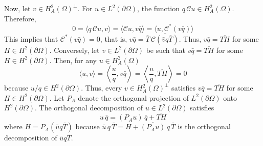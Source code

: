 \documentclass[11pt, reqno]{amsart}
\numberwithin{equation}{section}
\newcommand{\ov}{\overline}
\newcommand{\Om}{\Omega}
\begin{document}
\medskip

Now, let $v\in H_A^2(\Om)^{\perp}$. For $u\in L^2(\partial\Om)$, the function $q\,\mathcal{C}u \in H_A^2(\Omega)$. Therefore,
\[
0=\langle q\,\mathcal{C}u, v\rangle
= \langle \mathcal{C}u, v\bar{q}\rangle
= \langle u, \mathcal{C}^* (v\bar{q})\rangle
\]
This implies that $ \mathcal{C}^* (v\bar{q}) = 0$, that is, $v\bar{q} = \ov{T}\, \overline{\mathcal{C}(\bar{v}q\ov{T})}$. Thus, $v \bar{q} = \overline{TH}$ for some $H\in H^2(\partial\Om)$. Conversely, let $v\in L^2(\partial\Om)$ be such that $v \bar{q} = \overline{TH}$ for some $H\in H^2(\partial\Om)$. Then, for any $u\in H_A^2(\Om)$
\[
\langle u, v \rangle = \left\langle \frac{u}{q}, v\bar{q} \right\rangle 
=  \left\langle \frac{u}{q}, \overline{TH}\right\rangle = 0
\]
because $u/q\in H^2(\partial\Omega)$. Thus, every $v\in H^2_A(\Om)^{\perp}$ satisfies $v\bar{q} = \overline{TH}$ for some $H\in H^2(\partial\Om)$. Let $P_A$ denote the orthogonal projection of $L^2(\partial\Om)$ onto $H^2(\partial\Om)$. The orthogonal decomposition of $u\in L^2(\partial\Om)$ satisfies
\[
u\, \bar{q} = (P_A u) \,\bar{q} + \overline{TH}
\]
where $H = P_A(\bar{u}q\overline{T})$ because $\bar{u}\,q\,\overline{T} = H + \overline{(P_A u)}\, q\, \overline{T}$ is the orthogonal decomposition of $\bar{u}q\overline{T}$.

\medskip
\end{document}
